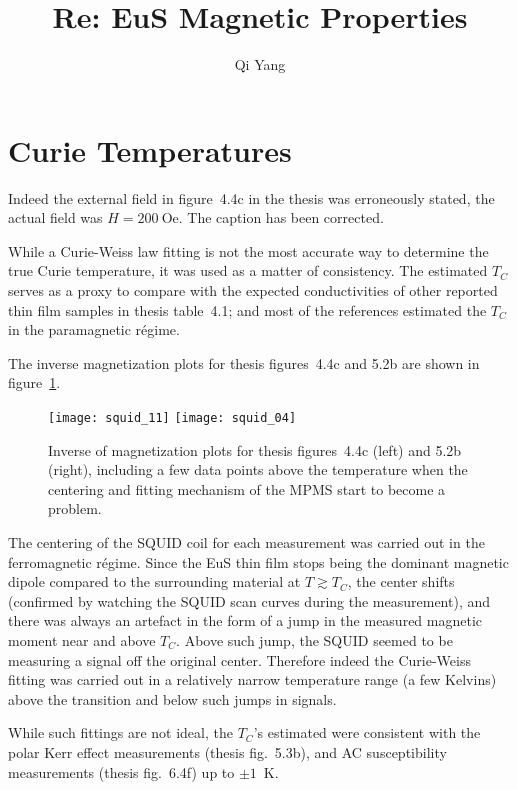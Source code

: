 \documentclass[11pt]{article}
\begin{document}
\title{Re: EuS Magnetic Properties}
\author{Qi Yang}
\maketitle
\tableofcontents

\section{Curie Temperatures}
Indeed the external field in figure~4.4c in the thesis was erroneously stated, the actual field was $H = 200~\mathrm{Oe}$. The caption has been corrected.

While a Curie-Weiss law fitting is not the most accurate way to determine the true Curie temperature, it was used as a matter of consistency. The estimated $T_C$ serves as a proxy to compare with the expected conductivities of other reported thin film samples in thesis table~4.1; and most of the references estimated the $T_C$ in the paramagnetic r\'egime.

The inverse magnetization plots for thesis figures~4.4c and 5.2b are shown in figure~\ref{fig:squid}.%
%
\begin{figure}[ht]%
    \centering%
    \texttt{[image: squid\_11]}%
    \texttt{[image: squid\_04]}%
    \caption[]{\label{fig:squid}Inverse of magnetization plots for thesis figures~4.4c (left) and 5.2b (right), including a few data points above the temperature when the centering and fitting mechanism of the MPMS start to become a problem.}%
\end{figure} %
The centering of the SQUID coil for each measurement was carried out in the ferromagnetic r\'egime. Since the EuS thin film stops being the dominant magnetic dipole compared to the surrounding material at $T \gtrsim T_C$, the center shifts (confirmed by watching the SQUID scan curves during the measurement), and there was always an artefact in the form of a jump in the measured magnetic moment near and above $T_C$. Above such jump, the SQUID seemed to be measuring a signal off the original center. Therefore indeed the Curie-Weiss fitting was carried out in a relatively narrow temperature range (a few Kelvins) above the transition and below such jumps in signals.

While such fittings are not ideal, the $T_C$'s estimated were consistent with the polar Kerr effect measurements (thesis fig.~5.3b), and AC susceptibility measurements (thesis fig.~6.4f) up to $\pm1$~K.
\end{document}
